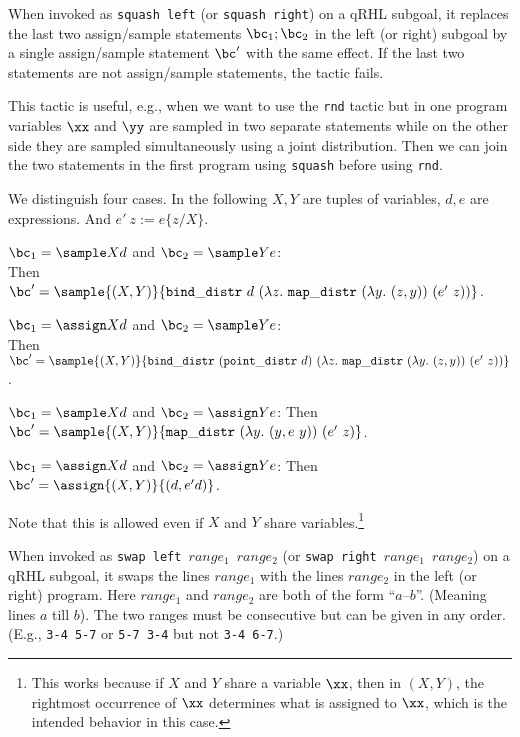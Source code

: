 \documentclass{article}
\begin{document}

When invoked as \texttt{squash left} (or \texttt{squash right}) on a
qRHL subgoal, it replaces the last two assign/sample statements $\bc_1;\bc_2$ in the
left (or right) subgoal by a single assign/sample statement $\bc'$ with the same effect.
If the last two statements are not assign/sample statements, the tactic fails.

This tactic is useful, e.g., when we want to use the \texttt{rnd}
tactic but in one program variables $\xx$ and $\yy$ are sampled in two
separate statements while on the other side they are sampled
simultaneously using a joint distribution. Then we can join the two
statements in the first program using \texttt{squash} before using
\texttt{rnd}.

We distinguish four cases.
In the following $X,Y$ are tuples of variables, $d,e$ are expressions.
And $e'\ z:=e\{z/X\}$.
\begin{compactitem}
\item $\bc_1=\sample X d$ and $\bc_2=\sample Y e$:\\
  Then $\bc'=\sample{(X,Y)}{\mathtt{bind\_distr}\ d\ (\lambda z.\ \mathtt{map\_distr}\ (\lambda y.\ (z,y))\ (e'\ z))}$.
\item $\bc_1=\assign X d$ and $\bc_2=\sample Y e$:\\
  Then $\bc'=\sample{(X,Y)}{\mathtt{bind\_distr}\ (\mathtt{point\_distr}\ d)\ (\lambda z.\ \mathtt{map\_distr}\ (\lambda y.\ (z,y))\ (e'\ z))}$.
\item $\bc_1=\sample X d$ and $\bc_2=\assign Y e$:
  Then $\bc'=\sample{(X,Y)}{\mathtt{map\_distr}\ (\lambda y.\ (y, e\ y))\ (e'\ z)}$.
\item $\bc_1=\assign X d$ and $\bc_2=\assign Y e$:
  Then $\bc'=\assign{(X,Y)}{(d, e' d)}$.
\end{compactitem}
Note that this is allowed even if $X$ and $Y$ share
variables.\footnote{This works because if $X$ and $Y$ share a variable $\xx$,
  then in $(X,Y)$, the rightmost occurrence of $\xx$ determines what is assigned to $\xx$,
  which is the intended behavior in this case.}



When invoked as \texttt{swap left $\mathit{range_1}$ $\mathit{range_2}$} (or \texttt{swap
  right $\mathit{range_1}$ $\mathit{range_2}$}) on a qRHL subgoal, it swaps the lines $\mathit{range_1}$ with the lines $\mathit{range_2}$ in the left (or right) program.
Here $\mathit{range_1}$ and $\mathit{range_2}$ are both of the form ``$a$--$b$''.
(Meaning lines $a$ till $b$).
The two ranges must be consecutive but can be given in any order.
(E.g., \texttt{3-4 5-7} or \texttt{5-7 3-4} but not \texttt{3-4 6-7}.)
\end{document}
